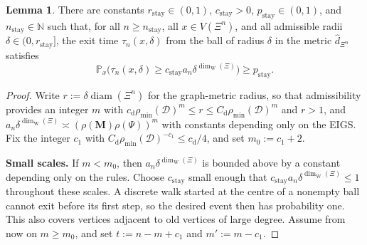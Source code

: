\documentclass{article}
\theoremstyle{plain}
\theoremstyle{definition}
\newtheorem{lemma}[theorem]{Lemma}
\newcommand{\dist}{\mathrm{d}}
\newcommand{\dimwalk}{\dim_\mathrm{W}}
\begin{document}
\begin{lemma}\label{lem:sec31_one_step_stay}
There are constants $r_{\mathrm{stay}}\in(0,1)$, $c_{\mathrm{stay}}>0$, $p_{\mathrm{stay}}\in(0,1)$, and $n_{\mathrm{stay}}\in\mathbb N$ such that, for all $n\ge n_{\mathrm{stay}}$, all $x\in V(\Xi^n)$, and all admissible radii $\delta\in(0,r_{\mathrm{stay}}]$, the exit time $\tau_n(x,\delta)$ from the ball of radius $\delta$ in the metric $\hat d_{\Xi^n}$ satisfies
\[
\mathbb P_x\bigl(\tau_n(x,\delta)\ge c_{\mathrm{stay}}a_n\delta^{\dimwalk(\Xi)}\bigr)\ge p_{\mathrm{stay}}.
\]
\end{lemma}

\begin{proof}
%
Write $r:=\delta\operatorname{diam}(\Xi^n)$ for the graph-metric radius, so that admissibility provides an integer $m$ with $c_{\dist}\rho_{\min}(\mathcal D)^m\le r\le C_{\dist}\rho_{\min}(\mathcal D)^m$ and $r>1$, and $a_n\delta^{\dimwalk(\Xi)}\asymp(\rho(\mathbf M)\rho(\Psi))^m$ with constants depending only on the EIGS.
Fix the integer $c_1$ with $C_{\dist}\rho_{\min}(\mathcal D)^{-c_1}\le c_{\dist}/4$, and set $m_0:=c_1+2$.

\begingroup\color{red}
\textbf{Small scales.}
If $m<m_0$, then $a_n\delta^{\dimwalk(\Xi)}$ is bounded above by a
constant depending only on the rules. Choose $c_{\mathrm{stay}}$ small
enough that $c_{\mathrm{stay}}a_n\delta^{\dimwalk(\Xi)}\le1$ throughout
these scales. A discrete walk started at the centre of a nonempty ball
cannot exit before its first step, so the desired event then has probability
one. This also covers vertices adjacent to old vertices of large degree.
\endgroup{}
Assume from now on $m\ge m_0$, and set $t:=n-m+c_1$ and $m':=m-c_1$.


\end{proof}
\end{document}
